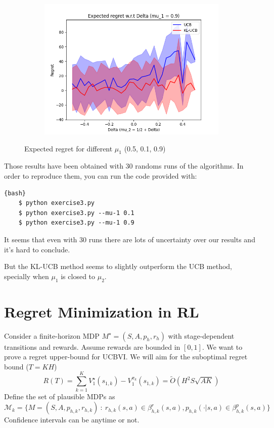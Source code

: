 \documentclass[a4paper]{article}
\newcommand{\wt}[1]{\widetilde{#1}}
\begin{document}
\begin{figure}[h!]
\begin{subfigure}[b]{0.3\linewidth}
        \includegraphics[width=\linewidth]{images/09}
    \end{subfigure}
    \caption{Expected regret for different $\mu_1$ (0.5, 0.1, 0.9)}
    \label{fig:results3}
\end{figure}

Those results have been obtained with 30 randoms runs of the algorithms. In order to reproduce them, you can run the code provided with:
\begin{lstlisting}{bash}
    $ python exercise3.py
    $ python exercise3.py --mu-1 0.1
    $ python exercise3.py --mu-1 0.9
\end{lstlisting}

It seems that even with 30 runs there are lots of uncertainty over our results and it's hard to conclude.

But the KL-UCB method seems to slightly outperform the UCB method, specially when $\mu_1$ is closed to $\mu_2$.

\section{Regret Minimization in RL}
Consider a finite-horizon MDP $M^\star = (S, A, p_h, r_h)$ with stage-dependent transitions and rewards. Assume rewards are bounded in $[0,1]$.
We want to prove a regret upper-bound for UCBVI. We will aim for the suboptimal regret bound ($T=KH$)
\[
    R(T) = \sum_{k=1}^K V^\star_1(s_{1,k}) - V^{\pi_k}_1(s_{1,k}) = \wt{O}(H^2S\sqrt{AK})
\]
Define the set of plausible MDPs as
\[
    \mathcal{M}_k = \{ M = (S,A, p_{h,k}, r_{h,k}) ~:~ r_{h,k}(s,a) \in \beta^r_{h,k}(s,a), p_{h,k}(\cdot|s,a) \in \beta^p_{h,k}(s,a)  \}
\]
Confidence intervals can be anytime or not.
\end{document}

